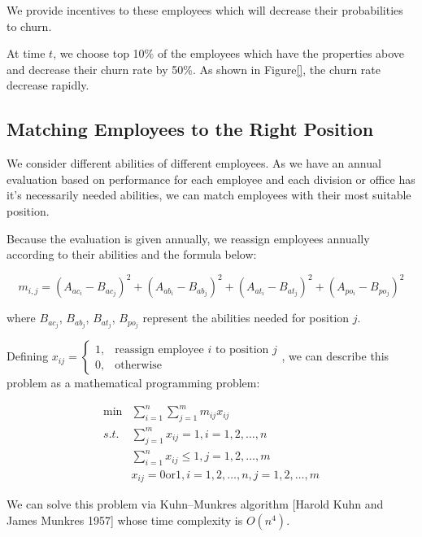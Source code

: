\documentclass[12pt,a4paper,titlepage]{article}
\begin{document}
We provide incentives to these employees which will decrease their
probabilities to churn.

At time $t$, we choose top 10\% of the employees which have the
properties above and decrease their churn rate by 50\%. As shown in
Figure\ref{}, the churn rate decrease rapidly.

\subsection{Matching Employees to the Right Position}
\label{sec:matching-employees-to-the-right-position}

We consider different abilities of different employees. As we have an
annual evaluation based on performance for each employee and each
division or office has it's necessarily needed abilities, we can match
employees with their most suitable position.

Because the evaluation is given annually, we reassign employees
annually according to their abilities and the formula below:

\begin{equation}
m_{i,j} =
{(A_{ac_i}-B_{ac_j})}^2 + {(A_{ab_i}-B_{ab_j})}^2 + {(A_{at_i}-B_{at_j})}^2
+ {(A_{po_i}-B_{po_j})}^2
\end{equation}

where $B_{ac_j}$, $B_{ab_j}$, $B_{at_j}$, $B_{po_j}$ represent the
abilities needed for position $j$.

Defining $x_{ij}=\begin{cases} 1 , & \mbox{reassign employee } i
  \mbox{ to position } j \\ 0,&\mbox{otherwise} \end{cases}$, we can
describe this problem as a mathematical programming problem:

\begin{equation}
  \begin{split}
  \min&\sum_{i=1}^n\sum_{j=1}^m m_{ij}x_{ij} \\
  s.t.& \sum_{j=1}^m x_{ij}=1, i=1,2,\ldots,n \\
  &\sum_{i=1}^n x_{ij} \le1,j=1,2,\ldots,m \\
  &x_{ij}=0 \mbox{or} 1,i=1,2,\ldots,n,j=1,2,\ldots,m
  \end{split}
\end{equation}

We can solve this problem via Kuhn–Munkres algorithm [Harold Kuhn and
James Munkres 1957] whose time complexity is $O(n^4)$.
\end{document}
